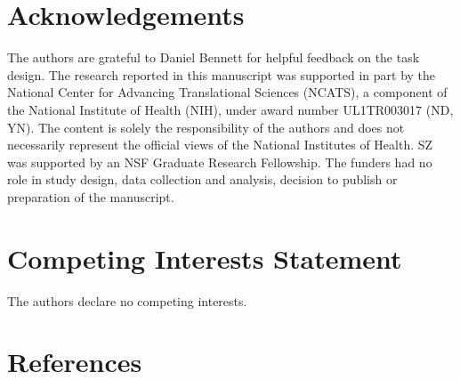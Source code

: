 \documentclass[a4paper,12pt]{article}
\begin{document}
\begin{refsection}[main]
\section*{Acknowledgements}

The authors are grateful to Daniel Bennett for helpful feedback on the task design. The research reported in this manuscript was supported in part by the National Center for Advancing Translational Sciences (NCATS), a component of the National Institute of Health (NIH), under award number UL1TR003017 (ND, YN). The content is solely the responsibility of the authors and does not necessarily represent the official views of the National Institutes of Health. SZ was supported by an NSF Graduate Research Fellowship. The funders had no role in study design, data collection and analysis, decision to publish or preparation of the manuscript.

\section*{Competing Interests Statement}

The authors declare no competing interests.

\break
\section*{References}
\printbibliography[heading=main]
\end{refsection}
\end{document}
